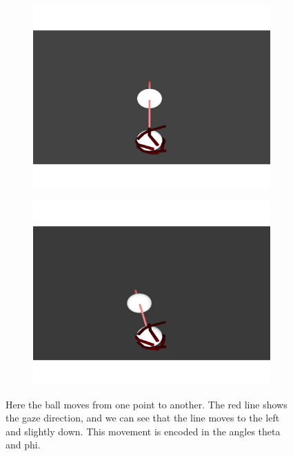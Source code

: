 \documentclass[../taasin.tex]{subfiles}
\begin{document}
\begin{figure}
     \centering
     \begin{subfigure}[b]{0.45\textwidth}
         \centering
         \includegraphics[width=\textwidth]{figures/image000028.pdf}
         \caption{}
         \label{fig:ball_pos1}
     \end{subfigure}
     \hfill
     \begin{subfigure}[b]{0.45\textwidth}
         \centering
         \includegraphics[width=\textwidth]{figures/image000068.pdf}
         \caption{}
         \label{fig:ball_pos2}
     \end{subfigure}
    \caption{Here the ball moves from one point to another. The red line shows the gaze direction, and we can see that the line moves to the left and slightly down. This movement is encoded in the angles theta and phi.  }
    \label{fig:ball_movement}
\end{figure}
\end{document}
